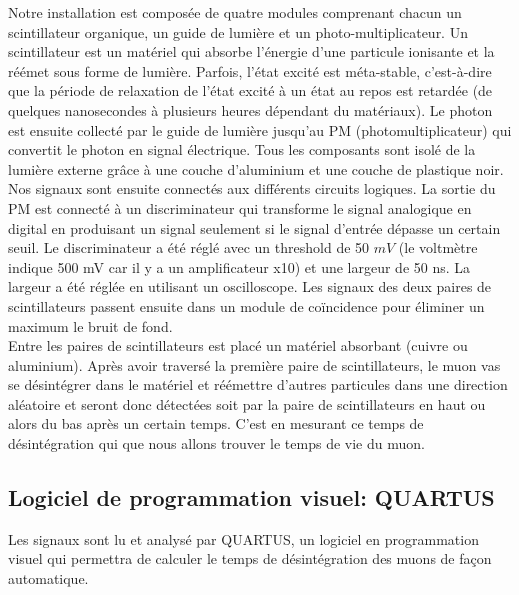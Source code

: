\documentclass[12pt]{article}
\begin{document}
Notre installation est composée de quatre modules comprenant chacun un scintillateur organique, un guide de lumière et un photo-multiplicateur. Un scintillateur est un matériel qui absorbe l'énergie d'une particule ionisante et la réémet sous forme de lumière. Parfois, l'état excité est méta-stable, c'est-à-dire que la période de relaxation de l'état excité à un état au repos est retardée (de quelques nanosecondes à plusieurs heures dépendant du matériaux). Le photon est ensuite collecté par le guide de lumière jusqu'au PM (photomultiplicateur) qui convertit le photon en signal électrique. Tous les composants sont isolé de la lumière externe grâce à une couche d'aluminium et une couche de plastique noir. \\
Nos signaux sont ensuite connectés aux différents circuits logiques. La sortie du PM est connecté à un discriminateur qui transforme le signal analogique en digital en produisant un signal seulement si le signal d'entrée dépasse un certain seuil. Le discriminateur a été réglé avec un threshold de 50 $mV$ (le voltmètre indique 500 mV car il y a un amplificateur x10) et une largeur de 50 ns. La largeur a été réglée en utilisant un oscilloscope. Les signaux des deux paires de scintillateurs passent ensuite dans un module de coïncidence pour éliminer un maximum le bruit de fond.
\\
Entre les paires de scintillateurs est placé un matériel absorbant (cuivre ou aluminium). Après avoir traversé la première paire de scintillateurs, le muon vas se désintégrer dans le matériel et réémettre d'autres particules dans une direction aléatoire et seront donc détectées soit par la paire de scintillateurs en haut ou alors du bas après un certain temps. C'est en mesurant ce temps de désintégration qui que nous allons trouver le temps de vie du muon.

\subsection{Logiciel de programmation visuel: QUARTUS}

Les signaux sont lu et analysé par QUARTUS, un logiciel en programmation visuel qui permettra de calculer le temps de désintégration des muons de façon automatique.
\end{document}

